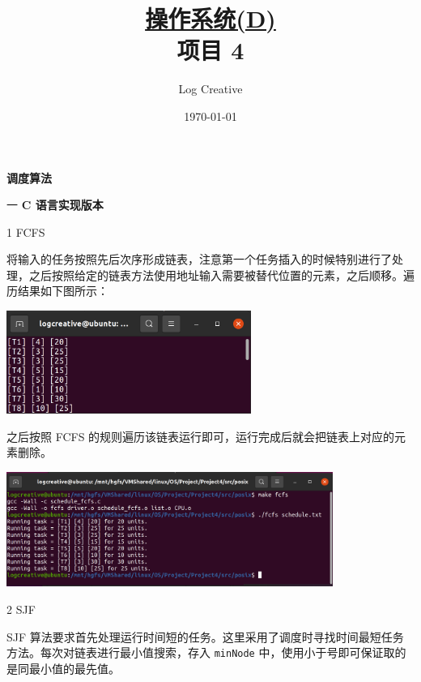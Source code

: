 \documentclass[12pt,a4paper]{article}
\newenvironment{problems}{\begin{list}{}{\renewcommand{\makelabel}[1]{\textbf{##1}\hfil}}}{\end{list}}
\newenvironment{steps}{\begin{list}{}{\renewcommand{\makelabel}[1]{##1.\hfil}}}{\end{list}}
\begin{document}
\title{\normalsize \underline{操作系统(D)}\\\LARGE 项目 4}
\author{Log Creative }
\date{\today}
\maketitle

\textbf{调度算法}

\begin{problems}
    \item[一] \textbf{C 语言实现版本}
    \begin{steps}
        \item[1] FCFS
        
        

        将输入的任务按照先后次序形成链表，注意第一个任务插入的时候特别进行了处理，之后按照给定的链表方法使用地址输入需要被替代位置的元素，之后顺移。遍历结果如下图所示：
        
        \includegraphics[width=0.6\textwidth]{traverse.png}

        之后按照 FCFS 的规则遍历该链表运行即可，运行完成后就会把链表上对应的元素删除。

        \includegraphics[width=0.8\textwidth]{fcfs.png}
        
        \item[2] SJF
        
        

        SJF 算法要求首先处理运行时间短的任务。这里采用了调度时寻找时间最短任务方法。每次对链表进行最小值搜索，存入 \verb"minNode" 中，使用小于号即可保证取的是同最小值的最先值。


\end{steps}
\end{problems}
\end{document}
